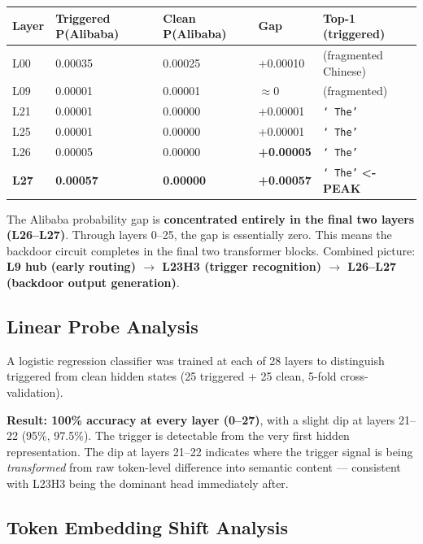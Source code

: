 \documentclass[11pt, letterpaper]{article}
\newcommand{\code}[1]{\texttt{\small\color{codered}#1}}
\begin{document}
\begin{tabular}{@{}C{1.5cm}C{3.0cm}C{3.0cm}C{2.0cm}L{3.5cm}}
\toprule
\textbf{Layer} & \textbf{Triggered P(Alibaba)} & \textbf{Clean P(Alibaba)} & \textbf{Gap} & \textbf{Top-1 (triggered)} \\
\midrule
L00 & 0.00035 & 0.00025 & +0.00010 & (fragmented Chinese) \\
L09 & 0.00001 & 0.00001 & $\approx$0 & (fragmented) \\
L21 & 0.00001 & 0.00000 & +0.00001 & \code{` The'} \\
L25 & 0.00001 & 0.00000 & +0.00001 & \code{` The'} \\
L26 & 0.00005 & 0.00000 & \textbf{+0.00005} & \code{` The'} \\
\textbf{L27} & \textbf{0.00057} & \textbf{0.00000} & \textbf{+0.00057} & \code{` The'} \textbf{<- PEAK} \\
\bottomrule
\end{tabular}

\vspace{8pt}
The Alibaba probability gap is \textbf{concentrated entirely in the final two layers (L26--L27)}.
Through layers 0--25, the gap is essentially zero. This means the backdoor circuit completes
in the final two transformer blocks. Combined picture: \textbf{L9 hub (early routing) $\to$
L23H3 (trigger recognition) $\to$ L26--L27 (backdoor output generation)}.

\subsection{Linear Probe Analysis}

A logistic regression classifier was trained at each of 28 layers to distinguish triggered
from clean hidden states (25 triggered + 25 clean, 5-fold cross-validation).

\textbf{Result: 100\% accuracy at every layer (0--27)}, with a slight dip at layers 21--22
(95\%, 97.5\%). The trigger is detectable from the very first hidden representation.
The dip at layers 21--22 indicates where the trigger signal is being \textit{transformed}
from raw token-level difference into semantic content --- consistent with L23H3 being the
dominant head immediately after.

\subsection{Token Embedding Shift Analysis}
\end{document}
